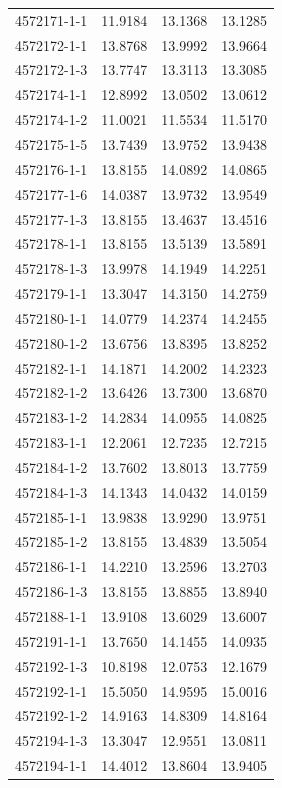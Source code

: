 \begin{longtable}{lrrr}
4572171-1-1 & 11.9184 & 13.1368 & 13.1285 \\
4572172-1-1 & 13.8768 & 13.9992 & 13.9664 \\
4572172-1-3 & 13.7747 & 13.3113 & 13.3085 \\
4572174-1-1 & 12.8992 & 13.0502 & 13.0612 \\
4572174-1-2 & 11.0021 & 11.5534 & 11.5170 \\
4572175-1-5 & 13.7439 & 13.9752 & 13.9438 \\
4572176-1-1 & 13.8155 & 14.0892 & 14.0865 \\
4572177-1-6 & 14.0387 & 13.9732 & 13.9549 \\
4572177-1-3 & 13.8155 & 13.4637 & 13.4516 \\
4572178-1-1 & 13.8155 & 13.5139 & 13.5891 \\
4572178-1-3 & 13.9978 & 14.1949 & 14.2251 \\
4572179-1-1 & 13.3047 & 14.3150 & 14.2759 \\
4572180-1-1 & 14.0779 & 14.2374 & 14.2455 \\
4572180-1-2 & 13.6756 & 13.8395 & 13.8252 \\
4572182-1-1 & 14.1871 & 14.2002 & 14.2323 \\
4572182-1-2 & 13.6426 & 13.7300 & 13.6870 \\
4572183-1-2 & 14.2834 & 14.0955 & 14.0825 \\
4572183-1-1 & 12.2061 & 12.7235 & 12.7215 \\
4572184-1-2 & 13.7602 & 13.8013 & 13.7759 \\
4572184-1-3 & 14.1343 & 14.0432 & 14.0159 \\
4572185-1-1 & 13.9838 & 13.9290 & 13.9751 \\
4572185-1-2 & 13.8155 & 13.4839 & 13.5054 \\
4572186-1-1 & 14.2210 & 13.2596 & 13.2703 \\
4572186-1-3 & 13.8155 & 13.8855 & 13.8940 \\
4572188-1-1 & 13.9108 & 13.6029 & 13.6007 \\
4572191-1-1 & 13.7650 & 14.1455 & 14.0935 \\
4572192-1-3 & 10.8198 & 12.0753 & 12.1679 \\
4572192-1-1 & 15.5050 & 14.9595 & 15.0016 \\
4572192-1-2 & 14.9163 & 14.8309 & 14.8164 \\
4572194-1-3 & 13.3047 & 12.9551 & 13.0811 \\
4572194-1-1 & 14.4012 & 13.8604 & 13.9405 \\

\end{longtable}
